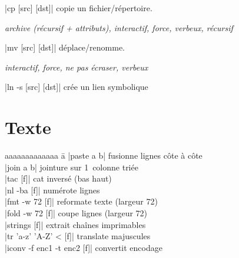 \documentclass{article}
\newenvironment{cmdblock}{%
  \par\setlength{\parindent}{0pt}\setlength{\parskip}{0pt}%
  \RaggedRight%
}{\par}
\newlength{\cmdoptindent}
\newcommand{\cmdopt}[1]{%
  \hspace*{\cmdoptindent}%
  \begin{minipage}[t]{\dimexpr\linewidth-\cmdoptindent\relax}
    \RaggedRight \itshape #1%
  \end{minipage}\par
}
\begin{document}
\begin{multicols}{4}
\begin{cmdblock}
        \code|cp [src] [dst]| \quad copie un fichier/répertoire. \\
        \cmdopt{ archive (récursif + attributs),
            \codx{-i} interactif,
            \codx{-f} force,
            \codx{-v} verbeux,
            \codx{-r} récursif}
        \code|mv [src] [dst]| \quad déplace/renomme. \\
        \cmdopt{ interactif,
             force,
            \codx{-n} ne pas écraser,
            \codx{-v} verbeux}
        \code|ln -s [src] [dst]| \quad crée un lien symbolique \\
    \end{cmdblock}

    \section*{Texte}
    \begin{tabbing}
        aaaaaaaaaaaaa \= a \kill
        \code|paste a b| \> fusionne lignes côte à côte \\
        \code|join a b| \> jointure sur 1\iere\ colonne triée \\
        \code|tac [f]| \> cat inversé (bas \textrightarrow{} haut) \\
        \code|nl -ba [f]| \> numérote lignes \\
        \code|fmt -w 72 [f]| \> reformate texte (largeur 72) \\
        \code|fold -w 72 [f]| \> coupe lignes (largeur 72) \\
        \code|strings [f]| \> extrait chaînes imprimables \\
        \code|tr 'a-z' 'A-Z' < [f]| translate majuscules \\
        \code|iconv -f enc1 -t enc2 [f]| convertit encodage \\
    \end{tabbing}


\end{multicols}
\end{document}
